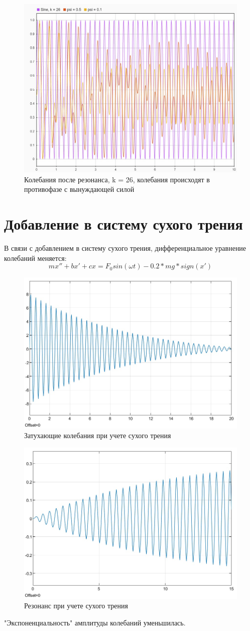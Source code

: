 \documentclass{article}
\begin{document}
	\begin{figure}
		\centering
		\includegraphics[width=0.7\linewidth]{signal3}
		\caption{Колебания после резонанса, k = 26, колебания происходят в противофазе с вынуждающей силой}
		\label{fig:signal3}
	\end{figure}
	
	\section*{Добавление в систему сухого трения}
	В связи с добавлением в систему сухого трения, дифференциальное уравнение колебаний меняется:
	$$mx''+bx'+cx=F_0sin(\omega t)-0.2*mg*sign(x')$$
	\begin{figure}[H]
		\centering
		\includegraphics[width=0.7\linewidth]{suhtr1}
		\caption{Затухающие колебания при учете сухого трения}
		\label{fig:suhtr1}
	\end{figure}
	\begin{figure}[H]
		\centering
		\includegraphics[width=0.7\linewidth]{suhtrres}
		\caption{Резонанс при учете сухого трения}
		\label{fig:suhtrres}
	\end{figure}
	"Экспоненциальность" амплитуды колебаний уменьшилась.
\end{document}
